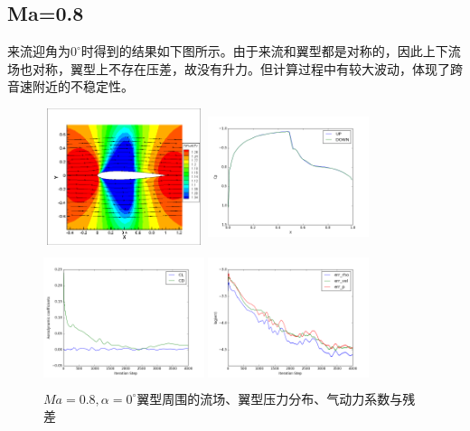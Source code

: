 \documentclass[UTF8]{ctexart}
\begin{document}
\subsection{Ma=0.8}
来流迎角为$0^\circ$时得到的结果如下图所示。由于来流和翼型都是对称的，因此上下流场也对称，翼型上不存在压差，故没有升力。但计算过程中有较大波动，体现了跨音速附近的不稳定性。
\begin{figure}[H]\centering
  \begin{minipage}{5cm}
    \centering
    \includegraphics[height=4cm,width=4.7cm]{../pic/0.8_0_flowfield.png}
  \end{minipage}%
  \begin{minipage}{5cm}
    \centering
    \includegraphics[height=4cm,width=4.7cm]{../pic/0.8_0_Cp.png}
  \end{minipage}

  \begin{minipage}{5cm}
    \centering
    \includegraphics[height=4cm,width=4.7cm]{../pic/0.8_0_cl_cd.png}
  \end{minipage}%
  \begin{minipage}{5cm}
    \centering
    \includegraphics[height=4cm,width=4.7cm]{../pic/0.8_0_residual.png}
  \end{minipage}
  \caption{$Ma=0.8,\alpha=0^\circ$翼型周围的流场、翼型压力分布、气动力系数与残差}
\end{figure}
\end{document}
